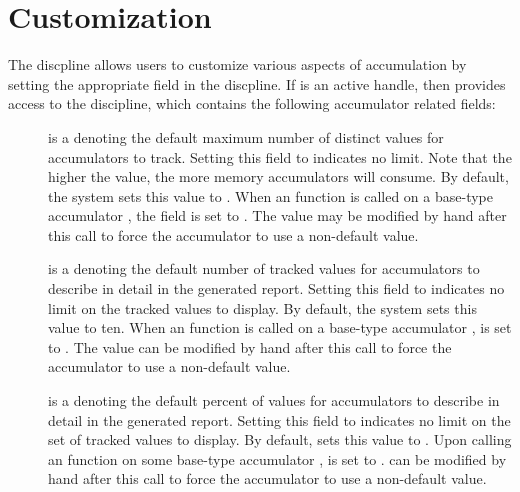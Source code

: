 \section{Customization}
The \pads{} discpline allows users to customize various aspects of
accumulation by setting the appropriate field in the discpline.  If
 is an active \pads{} handle, then  provides
access to the discipline, which contains the following accumulator
related fields: 

\begin{description}
\item[] is a  denoting the default maximum number of distinct values
   for accumulators to track. Setting this field to 
   indicates no limit. Note that the higher the value, the more memory
   accumulators will consume.  By default, the \pads{} system sets
   this value to . When an  function is
   called on a base-type accumulator , the field
    is set to .
   The value  may be modified by hand after this call
   to force the accumulator  to use a non-default value.

\item[] is a  denoting the default number of tracked values for
  accumulators to describe in detail in the generated report. Setting
  this field to  indicates no limit on the tracked values
  to display. By default, the \pads{} system sets this value to
  ten. When an  function is called on a 
  base-type accumulator ,  is set to
  . The value  can be 
  modified by hand after this call to force the accumulator  to
  use a non-default value. 

\item[] is a  denoting the default percent of values for
  accumulators to describe in detail in the generated report. Setting this field to 
  indicates no limit on the set of tracked values to display.  By
  default, \pads{} sets this value to .
  Upon calling an  function on some base-type accumulator ,
   is set to .
   can be modified by hand after this call to force
  the accumulator  to use a non-default value. 

\end{description}

